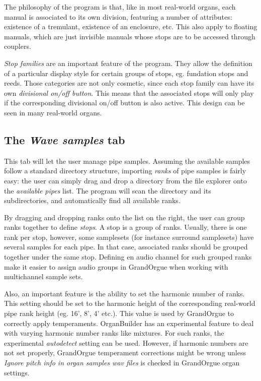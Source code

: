 \documentclass[a4paper,twoside,12pt]{extarticle}
\begin{document}
The philosophy of the program is that, like in most real-world organs, each manual is associated to its own division, featuring a number of attributes: existence of a tremulant, existence of an enclosure, etc. This also apply to floating manuals, which are just invisible manuals whose stops are to be accessed through couplers.

\textit{Stop families} are an important feature of the program. They allow the definition of a particular display style for certain groups of stops, eg. fundation stops and reeds. Those categories are not only cosmetic, since each stop family can have its own \textit{divisional on/off button}. This means that the associated stops will only play if the corresponding divisional on/off button is also active. This design can be seen in many real-world organs.

\subsection{The \textit{Wave samples} tab}

This tab will let the user manage pipe samples. Assuming the available samples follow a standard directory structure, importing \textit{ranks} of pipe samples is fairly easy: the user can simply drag and drop a directory from the file explorer onto the \textit{available pipes} list. The program will scan the directory and its subdirectories, and automatically find all available ranks.

By dragging and dropping ranks onto the list on the right, the user can group ranks together to define \textit{stops}. A stop is a group of ranks. Usually, there is one rank per stop, however, some samplesets (for instance surround samplesets) have several samples for each pipe. In that case, associated ranks should be grouped together under the same stop. Defining en audio channel for such grouped ranks make it easier to assign audio groups in GrandOrgue when working with multichannel sample sets.

Also, an important feature is the ability to set the harmonic number of ranks. This setting should be set to the harmonic height of the corresponding real-world pipe rank height (eg. 16', 8', 4' etc.). This value is used by GrandOrgue to correctly apply temperaments. OrganBuilder has an experimental feature to deal with varying harmonic number ranks like mixtures. For such ranks, the experimental \textit{autodetect} setting can be used. However, if harmonic numbers are not set properly, GrandOrgue temperament corrections might be wrong unless \textit{Ignore pitch info in organ samples wav files} is checked in GrandOrgue organ settings.
\end{document}
